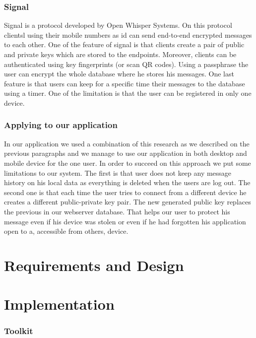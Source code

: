 \documentclass[11pt,a4paper]{report}
\begin{document}
\subsection{Signal}
Signal is a protocol developed by Open Whisper Systems. On this protocol clientsl using their mobile numbers as id can send end-to-end encrypted messages to each other. One of the feature of signal is that clients create a pair of public and private keys which are stored to the endpoints. Moreover, clients can be authenticated using key fingerprints (or scan QR codes). Using a passphrase the user can encrypt the whole database where he stores his messages. One last feature is that users can keep for a specific time their messages to the database using a timer. One of the limitation is that the user can be registered in only one device.

\subsection{Applying to our application}
In our application we used a combination of this research as we described on the previous paragraphs and we manage to use our application in both desktop and mobile device for the one user. In order to succeed on this approach we put some limitations to our system. The first is that user does not keep any message history on his local data as everything is deleted when the users are log out. The second one is that each time the user tries to connect from a different device he creates a different public-private key pair. The new generated public key replaces the previous in our webserver database. That helps our user to protect his message even if his device was stolen or even if he had forgotten his application open to a, accessible from others, device.



\chapter{Requirements and Design}


\chapter{Implementation}

\subsection{Toolkit}
\end{document}
